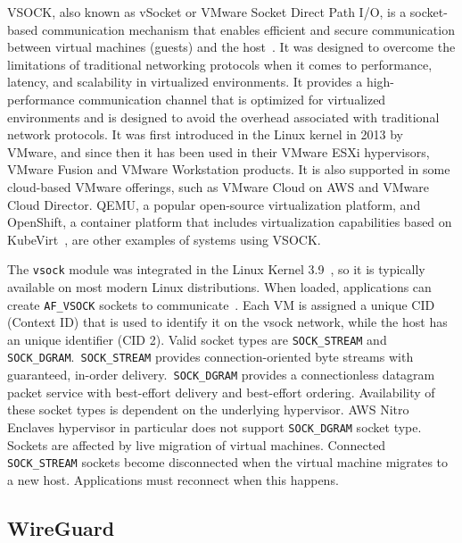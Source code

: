 \documentclass[a4paper, twocolumn]{article}
\begin{document}
VSOCK, also known as vSocket or VMware Socket Direct Path I/O, is a
socket-based communication mechanism that enables efficient and secure
communication between virtual machines (guests) and the
host~\cite{vmware_2023}. It was designed to overcome the limitations of
traditional networking protocols when it comes to performance, latency, and
scalability in virtualized environments. It provides a high-performance
communication channel that is optimized for virtualized environments and is
designed to avoid the overhead associated with traditional network protocols.
It was first introduced in the Linux kernel in 2013 by VMware, and since then
it has been used in their VMware ESXi hypervisors, VMware Fusion and VMware
Workstation products. It is also supported in some cloud-based VMware
offerings, such as VMware Cloud on AWS and VMware Cloud Director.
QEMU\cite{qemu_2023}, a popular open-source virtualization platform, and
OpenShift, a container platform that includes virtualization capabilities based
on KubeVirt~\cite{kubevirt_2023}, are other examples of systems using VSOCK.\@

The \texttt{vsock} module was integrated in the Linux Kernel
3.9~\cite{linuxarch_2012}, so it is typically available on most modern Linux
distributions. When loaded, applications can create \texttt{AF\_VSOCK} sockets
to communicate~\cite{manvsock_2023}. Each VM is assigned a unique CID (Context
ID) that is used to identify it on the vsock network, while the host has an
unique identifier (CID 2). Valid socket types are \texttt{SOCK\_STREAM} and
\texttt{SOCK\_DGRAM}.\  \texttt{SOCK\_STREAM} provides connection-oriented byte
streams with guaranteed, in-order delivery.\  \texttt{SOCK\_DGRAM} provides a
connectionless datagram packet service with best-effort delivery and
best-effort ordering. Availability of these socket types is dependent on the
underlying hypervisor. AWS Nitro Enclaves hypervisor in particular does not
support \texttt{SOCK\_DGRAM} socket type. Sockets are affected by live
migration of virtual machines. Connected \texttt{SOCK\_STREAM} sockets become
disconnected when the virtual machine migrates to a new host. Applications
must reconnect when this happens.

\subsection{WireGuard}\label{sec:wireguard}
\end{document}
